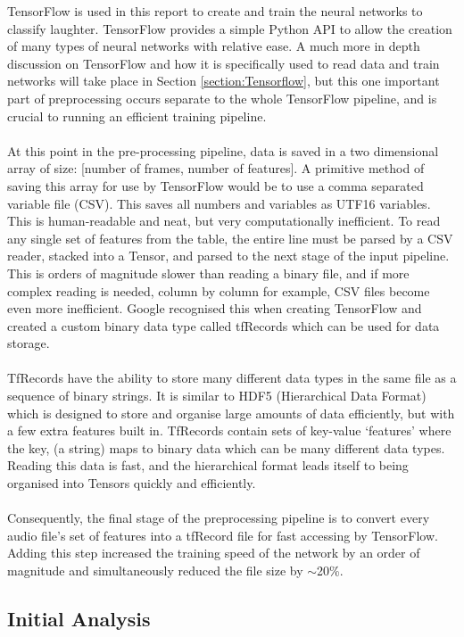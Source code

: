 \documentclass[a4paper,11pt,notitlepage]{article}
\begin{document}
TensorFlow is used in this report to create and train the neural networks to classify laughter. TensorFlow provides a simple Python API to allow the creation of many types of neural networks with relative ease. A much more in depth discussion on TensorFlow and how it is specifically used to read data and train networks will take place in Section \ref{section:Tensorflow}, but this one important part of preprocessing occurs separate to the whole TensorFlow pipeline, and is crucial to running an efficient training pipeline.\\
\\
At this point in the pre-processing pipeline, data is saved in a two dimensional array of size: [number of frames, number of features]. A primitive method of saving this array for use by TensorFlow would be to use a comma separated variable file (CSV). This saves all numbers and variables as UTF16 variables. This is human-readable and neat, but very computationally inefficient. To read any single set of features from the table, the entire line must be parsed by a CSV reader, stacked into a Tensor, and parsed to the next stage of the input pipeline. This is orders of magnitude slower than reading a binary file, and if more complex reading is needed, column by column for example, CSV files become even more inefficient. Google recognised this when creating TensorFlow and created a custom binary data type called tfRecords which can be used for data storage.\\
\\
TfRecords have the ability to store many different data types in the same file as a sequence of binary strings. It is similar to HDF5 (Hierarchical Data Format) which is designed to store and organise large amounts of data efficiently, but with a few extra features built in. TfRecords contain sets of key-value `features' where the key, (a string) maps to binary data which can be many different data types. Reading this data is fast, and the hierarchical format leads itself to being organised into Tensors quickly and efficiently.\\
\\
Consequently, the final stage of the preprocessing pipeline is to convert every audio file's set of features into a tfRecord file for fast accessing by TensorFlow. Adding this step increased the training speed of the network by an order of magnitude and simultaneously reduced the file size by $\sim$20\%.

\subsection{Initial Analysis}
\end{document}
